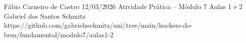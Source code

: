 \documentclass{article}
\begin{document}
{Fábio Carneiro de Castro}
{12/03/2026}
{Atividade Prática -- Módulo 7}
{Aulas 1 e 2}
{Gabriel dos Santos Schmitz}
{https://github.com/gabrielzschmitz/uni/tree/main/hackers-do-bem/fundamental/modulo7/aulas1-2}




\newpage
\printbibliography[title=Referências]
\end{document}
